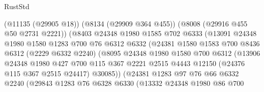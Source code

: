 \begin{lexlean}{RustStd}
\begin{coremodule}
{\begin{coremodule}
{{{{{{{{{{{{{{{{{{{{{{{{{{{{{{{{{{{{{{{{{{{{{{{{{{{{{                            (@11135 (@29905 @18))
                            (@8134 (@29909 @364 @455))
                            (@8008 (@29916 @455 @50 @2731 @2221))
                            (@8403
                              @24348
                              @1980
                              @1585
                              @702
                              @6333
                              (@13091
                                @24348
                                @1980
                                @1580
                                @1283
                                @700
                                @76
                                @6312
                                @6332
                                (@24381
                                  @1580
                                  @1583
                                  @700
                                  @8436
                                  @6312
                                  (@2229 @6332 @2240)
                                  (@8095
                                    @24348
                                    @1980
                                    @1580
                                    @700
                                    @6312
                                    (@13906
                                      @24348
                                      @1980
                                      @427
                                      @700
                                      @115
                                      @367
                                      @2221
                                      @2515
                                      @4443
                                      @12150
                                      (@24376 @115 @367 @2515 @24417)
                                      @30085))
                                  (@24381
                                    @1283
                                    @97
                                    @76
                                    @66
                                    @6332
                                    @2240
                                    (@29843
                                      @1283
                                      @76
                                      @6328
                                      @6330
                                      (@13332
                                        @24348
                                        @1980
                                        @86
                                        @700
}}}}}}}}}}}}}}}}}}}}}}}}}}}}}}}}}}}}}}}}}}}}}}}}}}}}}
\end{coremodule}}
\end{coremodule}
\end{lexlean}

